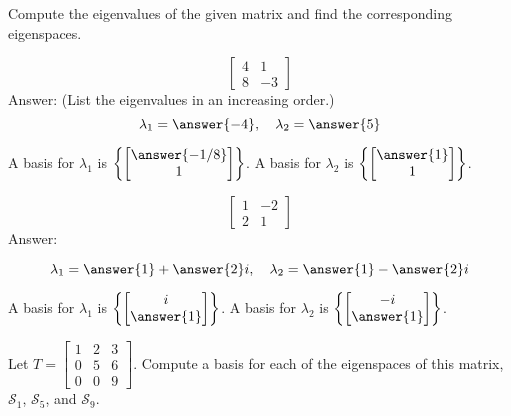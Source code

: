 \documentclass{ximera}
\begin{document}
\begin{problem}
Compute the eigenvalues of the given matrix and find the corresponding eigenspaces.
\begin{problem}\label{prob:eigenspace3}
$$\begin{bmatrix}4&1\\8&-3\end{bmatrix}$$
Answer:
(List the eigenvalues in an increasing order.)
$$\lambda_1=\answer{-4},\quad\lambda_2=\answer{5}$$

A basis for $\lambda_1$ is $\left\{\begin{bmatrix}\answer{-1/8}\\1\end{bmatrix}\right\}$.  A basis for $\lambda_2$ is $\left\{\begin{bmatrix}\answer{1}\\1\end{bmatrix}\right\}$.
\end{problem}
\begin{problem}\label{prob:eigenspace4}
$$\begin{bmatrix}1&-2\\2&1\end{bmatrix}$$
Answer:

$$\lambda_1=\answer{1}+\answer{2}i,\quad\lambda_2=\answer{1}-\answer{2}i$$

A basis for $\lambda_1$ is $\left\{\begin{bmatrix}i\\\answer{1}\end{bmatrix}\right\}$.  A basis for $\lambda_2$ is $\left\{\begin{bmatrix}-i\\\answer{1}\end{bmatrix}\right\}$.
\end{problem}
\end{problem}

\begin{problem}\label{prob:3x3tri_ev}
Let $T=\begin{bmatrix} 1 & 2 & 3\\ 0 & 5 & 6\\ 0 & 0 & 9\end{bmatrix}$.  Compute a basis for each of the eigenspaces of this matrix, $\mathcal{S}_1$, $\mathcal{S}_5$, and $\mathcal{S}_9$.
\end{problem}
\end{document}
